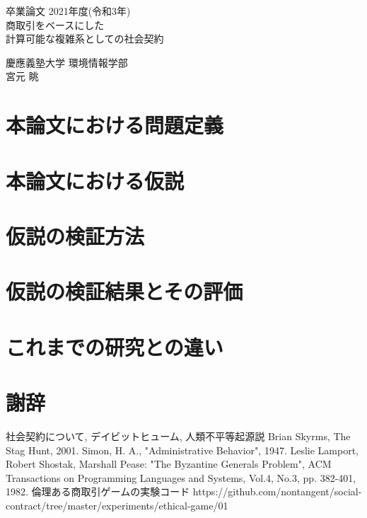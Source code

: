 \documentclass[a4j]{ujreport}
\date{\today}
\def\title{商取引をベースにした\\計算可能な複雑系としての社会契約}
\def\author{宮元 眺}
\def\dept{慶應義塾大学 環境情報学部}
\begin{document}
\begin{titlepage}
  \begin{center}
    \begin{large}
      卒業論文   2021年度(令和3年)\\
      \vspace{24pt}
      \title
    \end{large}
  \end{center}
  \vspace{40em}
  \begin{flushright}
    \large \dept\\
    \author
  \end{flushright}
\end{titlepage}



\tableofcontents\thispagestyle{plain}



\chapter{本論文における問題定義}
\chapter{本論文における仮説}
\chapter{仮説の検証方法}
\chapter{仮説の検証結果とその評価}



\chapter{これまでの研究との違い}

\chapter*{謝辞}

\begin{thebibliography}{数字}
   社会契約について, デイビットヒューム,
   人類不平等起源説
   Brian Skyrms, The Stag Hunt, 2001.
   Simon, H. A., "Administrative Behavior", 1947.
   Leslie Lamport, Robert Shostak, Marshall Pease: "The Byzantine Generals Problem", ACM Transactions on Programming Languages and Systems, Vol.4, No.3, pp. 382-401, 1982.
   倫理ある商取引ゲームの実験コード https://github.com/nontangent/social-contract/tree/master/experiments/ethical-game/01
\end{thebibliography}
\end{document}
